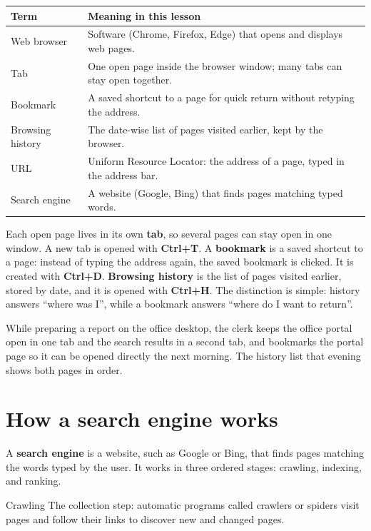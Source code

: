 \begin{center}
\begin{tabular}{p{}p{}}
\toprule
\textbf{Term} & \textbf{Meaning in this lesson} \\
\midrule
Web browser & Software (Chrome, Firefox, Edge) that opens and displays web pages. \\
Tab & One open page inside the browser window; many tabs can stay open together. \\
Bookmark & A saved shortcut to a page for quick return without retyping the address. \\
Browsing history & The date-wise list of pages visited earlier, kept by the browser. \\
URL & Uniform Resource Locator: the address of a page, typed in the address bar. \\
Search engine & A website (Google, Bing) that finds pages matching typed words. \\
\bottomrule
\end{tabular}
\end{center}

Each open page lives in its own \textbf{tab}, so several pages can stay open
in one window. A new tab is opened with \textbf{Ctrl+T}. A \textbf{bookmark}
is a saved shortcut to a page: instead of typing the address again, the saved
bookmark is clicked. It is created with \textbf{Ctrl+D}. \textbf{Browsing
history} is the list of pages visited earlier, stored by date, and it is
opened with \textbf{Ctrl+H}. The distinction is simple: history answers
``where was I'', while a bookmark answers ``where do I want to return''.

\begin{example}
While preparing a report on the office desktop, the clerk keeps the office
portal open in one tab and the search results in a second tab, and bookmarks
the portal page so it can be opened directly the next morning. The history
list that evening shows both pages in order.
\end{example}

\section{How a search engine works}
A \textbf{search engine} is a website, such as Google or Bing, that finds
pages matching the words typed by the user. It works in three ordered stages:
crawling, indexing, and ranking.

\begin{definitionbox}{Crawling}
The collection step: automatic programs called crawlers or spiders visit
pages and follow their links to discover new and changed pages.
\end{definitionbox}

